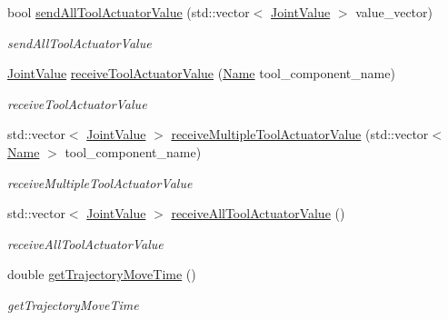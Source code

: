 \begin{DoxyCompactItemize}
bool \hyperlink{classrobotis__manipulator_1_1_robotis_manipulator_a38199015be96eda5b890a4d42036633b}{send\+All\+Tool\+Actuator\+Value} (std\+::vector$<$ \hyperlink{namespacerobotis__manipulator_aa0556c98c5294ccf3a96c2d0fe315e40}{Joint\+Value} $>$ value\+\_\+vector)
\begin{DoxyCompactList}\small\item\em send\+All\+Tool\+Actuator\+Value \end{DoxyCompactList}\item 
\hyperlink{namespacerobotis__manipulator_aa0556c98c5294ccf3a96c2d0fe315e40}{Joint\+Value} \hyperlink{classrobotis__manipulator_1_1_robotis_manipulator_a89d6e1651b6a9583b15f65e3fc836185}{receive\+Tool\+Actuator\+Value} (\hyperlink{namespacerobotis__manipulator_a08c2d25e77a01ad75b9bb740f8ce4765}{Name} tool\+\_\+component\+\_\+name)
\begin{DoxyCompactList}\small\item\em receive\+Tool\+Actuator\+Value \end{DoxyCompactList}\item 
std\+::vector$<$ \hyperlink{namespacerobotis__manipulator_aa0556c98c5294ccf3a96c2d0fe315e40}{Joint\+Value} $>$ \hyperlink{classrobotis__manipulator_1_1_robotis_manipulator_a49ac3c2ae1b40f21bed7df77da3c7afe}{receive\+Multiple\+Tool\+Actuator\+Value} (std\+::vector$<$ \hyperlink{namespacerobotis__manipulator_a08c2d25e77a01ad75b9bb740f8ce4765}{Name} $>$ tool\+\_\+component\+\_\+name)
\begin{DoxyCompactList}\small\item\em receive\+Multiple\+Tool\+Actuator\+Value \end{DoxyCompactList}\item 
std\+::vector$<$ \hyperlink{namespacerobotis__manipulator_aa0556c98c5294ccf3a96c2d0fe315e40}{Joint\+Value} $>$ \hyperlink{classrobotis__manipulator_1_1_robotis_manipulator_aedef5967547a7c3ddb545d2efdd35b89}{receive\+All\+Tool\+Actuator\+Value} ()
\begin{DoxyCompactList}\small\item\em receive\+All\+Tool\+Actuator\+Value \end{DoxyCompactList}\item 
double \hyperlink{classrobotis__manipulator_1_1_robotis_manipulator_aafbb0e172091a140ceb666fa54140b11}{get\+Trajectory\+Move\+Time} ()
\begin{DoxyCompactList}\small\item\em get\+Trajectory\+Move\+Time \end{DoxyCompactList}\item 

\end{DoxyCompactItemize}
